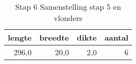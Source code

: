 \begin{table}[h!]
\centering
\caption{Stap 6 Samenstelling stap 5 en vlonders}
\begin{tabular}{rrrr}
\toprule
 lengte &  breedte &  dikte &  aantal \\
\midrule
  296,0 &     20,0 &    2,0 &       6 \\
\bottomrule
\end{tabular}
\end{table}
